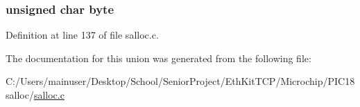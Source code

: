 \subsubsection[{byte}]{\setlength{\rightskip}{0pt plus 5cm}unsigned char byte}\label{union___s_a_l_l_o_c_a1581cde4f73c9a797ae1e7afcc1bb3de}


Definition at line 137 of file salloc.\+c.



The documentation for this union was generated from the following file\+:\begin{DoxyCompactItemize}
\item 
C\+:/\+Users/mainuser/\+Desktop/\+School/\+Senior\+Project/\+Eth\+Kit\+T\+C\+P/\+Microchip/\+P\+I\+C18 salloc/\hyperlink{salloc_8c}{salloc.\+c}\end{DoxyCompactItemize}
